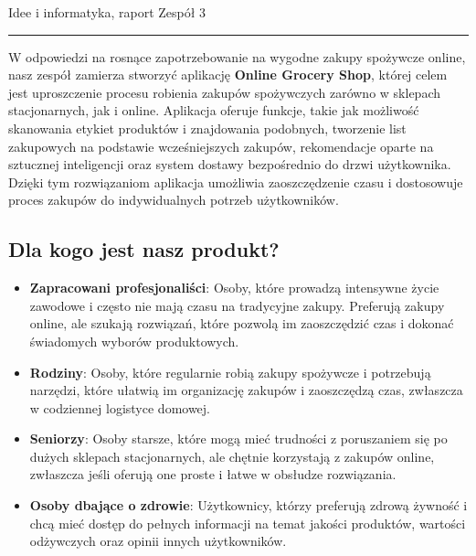 \documentclass[12pt,a4paper]{article}
\begin{document}
\begin{Large}
    Idee i informatyka, raport
	\hfill
	Zespół 3
\end{Large}
\rule{\columnwidth}{1pt}

W odpowiedzi na rosnące zapotrzebowanie na wygodne zakupy spożywcze online, nasz zespół zamierza
stworzyć aplikację \textbf{Online Grocery Shop}, której celem jest uproszczenie procesu robienia
zakupów spożywczych zarówno w sklepach stacjonarnych, jak i online. Aplikacja oferuje funkcje,
takie jak możliwość skanowania etykiet produktów i znajdowania podobnych,
tworzenie list zakupowych na podstawie wcześniejszych zakupów, rekomendacje oparte na
sztucznej inteligencji oraz system dostawy
bezpośrednio do drzwi użytkownika. Dzięki tym rozwiązaniom aplikacja umożliwia zaoszczędzenie
czasu i dostosowuje proces zakupów do indywidualnych potrzeb użytkowników.

\subsection*{Dla kogo jest nasz produkt?}
\begin{itemize}
    \item \textbf{Zapracowani profesjonaliści}: Osoby, które prowadzą intensywne życie zawodowe i często nie mają czasu na tradycyjne zakupy. Preferują zakupy online, ale szukają rozwiązań, które pozwolą im zaoszczędzić czas i dokonać świadomych wyborów produktowych.
    \item \textbf{Rodziny}: Osoby, które regularnie robią zakupy spożywcze i potrzebują narzędzi, które ułatwią im organizację zakupów i zaoszczędzą czas, zwłaszcza w codziennej logistyce domowej.
    \item \textbf{Seniorzy}: Osoby starsze, które mogą mieć trudności z poruszaniem się po dużych sklepach stacjonarnych, ale chętnie korzystają z zakupów online, zwłaszcza jeśli oferują one proste i łatwe w obsłudze rozwiązania.
    \item \textbf{Osoby dbające o zdrowie}: Użytkownicy, którzy preferują zdrową żywność i chcą mieć dostęp do pełnych informacji na temat jakości produktów, wartości odżywczych oraz opinii innych użytkowników.
\end{itemize}
\end{document}
